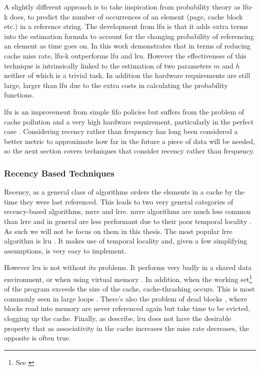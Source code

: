 A slightly different approach is to take inspiration from probability theory as \gls{lfu-k} \cite{sokolinskyLFUKEffectiveBuffer2004} does, to predict the number of occurrences of an element (page, cache block etc.) in a reference string. The development from \gls{lfu} is that it adds extra terms into the estimation formula to account for the changing probability of referencing an element as time goes on. In this work \citeauthor{sokolinskyLFUKEffectiveBuffer2004} demonstrates that in terms of reducing cache miss rate, \gls{lfu-k} outperforms \gls{lfu} and \gls{lru}. However the effectiveness of this technique is intrinsically linked to the estimation of two parameters $m$ and $h$ neither of which is a trivial task. In addition the hardware requirements are still large, larger than \gls{lfu} due to the extra costs in calculating the probability functions. 

\gls{lfu} is an improvement from simple \gls{fifo} policies but suffers from the problem of cache pollution and a very high hardware requirement, particularly in the perfect case \cite{podlipnigSurveyWebCache2003}. Considering recency rather than frequency has long been considered a better metric to approximate how far in the future a piece of data will be needed, so the next section covers techniques that consider recency rather than frequency. 

\subsubsection{Recency Based Techniques}
\label{sec:recency}

Recency, as a general class of algorithms orders the elements in a cache by the time they were last referenced. This leads to two very general categories of recency-based algorithms, \gls{mrre} and \gls{lrre}. \gls{mrre} algorithms are much less common than \gls{lrre} and in general are less performant due to their poor temporal locality \cite{pandaSurveyReplacementStrategies2016}. As such we will not be focus on them in this thesis. The most popular \gls{lrre} algorithm is \gls{lru} \cite{pitkowSimpleRobustCaching1994, karedlaCachingStrategiesImprove1994, smithCacheMemories1982}. It makes use of temporal locality and, given a few simplifying assumptions, is very easy to implement.

However \gls{lru} is not without its problems. It performs very badly in a shared data environment, or when using virtual memory \cite{bansalCARClockAdaptive2004}. In addition, when the working set\footnote{See \cite{denningWorkingSetModel1968}} of the program exceeds the size of the cache, cache-thrashing \cite{denningThrashingItsCauses1968} occurs. This is most commonly seen in large loops \cite{linPredictingLastTouchReferences2002}. There's also the problem of dead blocks \cite{liuCacheBurstsNew2008}, where blocks read into memory are never referenced again but take time to be evicted, clogging up the cache. Finally, as \citet{linPredictingLastTouchReferences2002} describe, \gls{lru} does not have the desirable property that as associativity in the cache increases the miss rate decreases, the opposite is often true.


